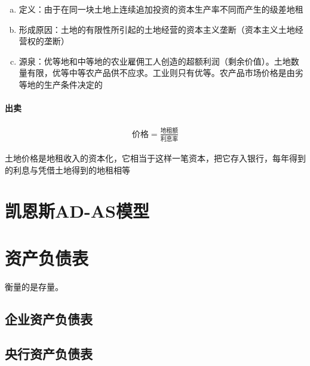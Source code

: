 \documentclass[12pt]{book}
\begin{document}
\begin{enumerate}[1.]
\begin{enumerate}[(1)]
\begin{enumerate}[a.]
                        \item 定义：由于在同一块土地上连续追加投资的资本生产率不同而产生的级差地租
                        \item 形成原因：土地的有限性所引起的土地经营的资本主义垄断（资本主义土地经营权的垄断）
                        \item 源泉：优等地和中等地的农业雇佣工人创造的超额利润（剩余价值）。土地数量有限，优等中等农产品供不应求。工业则只有优等。农产品市场价格是由劣等地的生产条件决定的
                    \end{enumerate}
          \end{enumerate}
\end{enumerate}











\subsubsection{出卖}

\begin{gather*}
    \text{价格}=\frac{\text{地租额}}{\text{利息率}}
\end{gather*}


土地价格是地租收入的资本化，它相当于这样一笔资本，把它存入银行，每年得到的利息与凭借土地得到的地租相等



\chapter{凯恩斯AD-AS模型}\label{chapter:凯恩斯AD-AS模型}





\chapter{资产负债表}

衡量的是存量。

\section{企业资产负债表}



\section{央行资产负债表}
\end{document}
